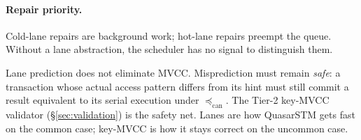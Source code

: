 \paragraph{Repair priority.}
Cold-lane repairs are background work; hot-lane repairs preempt the
queue. Without a lane abstraction, the scheduler has no signal to
distinguish them.

\begin{remark}
\label{rem:lane-not-sufficient}
Lane prediction does not eliminate MVCC. Misprediction must remain
\emph{safe}: a transaction whose actual access pattern differs from
its hint must still commit a result equivalent to its serial
execution under $\preceq_{\mathrm{can}}$. The Tier-2 key-MVCC
validator (\S\ref{sec:validation}) is the safety net. Lanes are how
QuasarSTM gets fast on the common case; key-MVCC is how it stays
correct on the uncommon case.
\end{remark}


